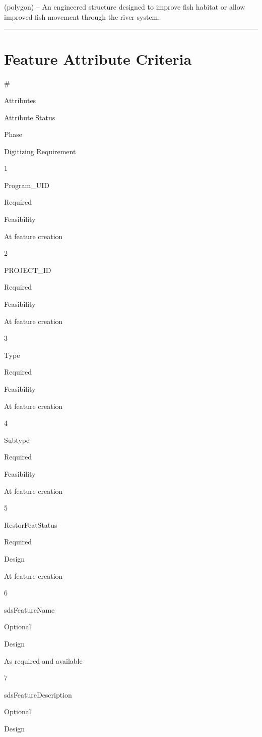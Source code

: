 \documentclass[
  letterpaper,
  DIV=11,
  numbers=noendperiod]{scrreprt}
\begin{document}
(polygon) -- An engineered structure designed to improve fish habitat or
allow improved fish movement through the river system.

\begin{center}\rule{0.5\linewidth}{0.5pt}\end{center}

\section{Feature Attribute Criteria}\label{feature-attribute-criteria-3}

\#

Attributes

Attribute Status

Phase

Digitizing Requirement

1

Program\_UID

Required

Feasibility

At feature creation

2

PROJECT\_ID

Required

Feasibility

At feature creation

3

Type

Required

Feasibility

At feature creation

4

Subtype

Required

Feasibility

At feature creation

5

RestorFeatStatus

Required

Design

At feature creation

6

sdsFeatureName

Optional

Design

As required and available

7

sdsFeatureDescription

Optional

Design
\end{document}
